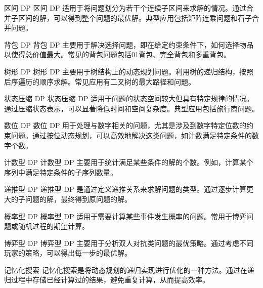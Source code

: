 \documentclass{beamer}
\begin{document}
\begin{frame}{区间 DP}
    区间 DP 适用于将问题划分为若干个连续子区间来求解的情况。通过合并子区间的解，可以得到整个问题的最优解。典型应用包括矩阵连乘问题和石子合并问题。
\end{frame}

\begin{frame}{背包 DP}
    背包 DP 主要用于解决选择问题，即在给定约束条件下，如何选择物品以使得总价值最大。常见的背包问题包括01背包、完全背包和多重背包。
\end{frame}

\begin{frame}{树形 DP}
    树形 DP 主要用于树结构上的动态规划问题。利用树的递归结构，按照后序遍历的顺序求解。常见应用有二叉树的最大路径和问题。
\end{frame}

\begin{frame}{状态压缩 DP}
    状态压缩 DP 适用于问题的状态空间较大但具有特定规律的情况。通过压缩状态表示，可以显著降低时间和空间复杂度。典型应用包括旅行商问题。
\end{frame}

\begin{frame}{数位 DP}
    数位 DP 用于处理与数字相关的问题，尤其是涉及到数字特定位数的约束问题。通过按位动态规划，可以高效地解决这类问题，如计数满足特定条件的数字个数。
\end{frame}

\begin{frame}{计数型 DP}
    计数型 DP 主要用于统计满足某些条件的解的个数。例如，计算某个序列中满足特定条件的子序列数量。
\end{frame}

\begin{frame}{递推型 DP}
    递推型 DP 是通过定义递推关系来求解问题的类型。通过逐步计算更大的子问题的解，最终得到原问题的解。
\end{frame}

\begin{frame}{概率型 DP}
    概率型 DP 适用于需要计算某些事件发生概率的问题。常用于博弈问题或随机过程的期望计算。
\end{frame}

\begin{frame}{博弈型 DP}
    博弈型 DP 主要用于分析双人对抗类问题的最优策略。通过考虑不同玩家的策略，可以得出每一步的最优解。
\end{frame}

\begin{frame}{记忆化搜索}
    记忆化搜索是将动态规划的递归实现进行优化的一种方法。通过在递归过程中存储已经计算过的结果，避免重复计算，从而提高效率。
\end{frame}
\end{document}
